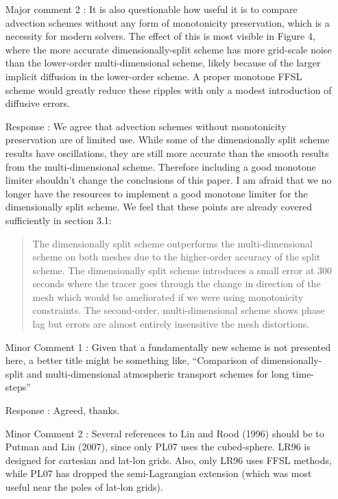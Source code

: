 \documentclass[12pt]{article}
\begin{document}
\begin{enumerate}
\item [Major comment 2]: It is also questionable how useful it is to compare advection schemes without any form of monotonicity preservation, which is a necessity for modern solvers. The effect of this is most visible in Figure 4, where the more accurate dimensionally-split scheme has more grid-scale noise than the lower-order multi-dimensional scheme, likely because of the larger implicit diffusion in the lower-order scheme. A proper monotone FFSL scheme would greatly reduce these ripples with only a modest introduction of diffusive errors.

\item [Response]: We agree that advection schemes without monotonicity preservation are of limited use. While some of the dimensionally split scheme results have oscillations, they are still more accurate than the smooth results from the multi-dimensional scheme. Therefore including a good monotone limiter shouldn't change the conclusions of this paper. I am afraid that we no longer have the resources to implement a good monotone limiter for the dimensionally split scheme. We feel that these points are already covered sufficiently in section 3.1:
\begin{quote}
The dimensionally split scheme outperforms the multi-dimensional scheme on both meshes due to the higher-order accuracy of the split scheme. The dimensionally split scheme introduces a small error at 300 seconds where the tracer goes through the change in direction of the mesh which would be ameliorated if we were using monotonicity constraints. The second-order, multi-dimensional scheme shows phase lag but errors are almost entirely insensitive the mesh distortions. 
\end{quote}

\item [Minor Comment 1]: Given that a fundamentally new scheme is not presented here, a better title might be something like, ``Comparison of dimensionally-split and multi-dimensional atmospheric transport schemes for long time-steps''

\item [Response]: Agreed, thanks.

\item [Minor Comment 2]: Several references to Lin and Rood (1996) should be to Putman and Lin (2007), since only PL07 uses the cubed-sphere. LR96 is designed for cartesian and lat-lon grids. Also, only LR96 uses FFSL methods, while PL07 has dropped the semi-Lagrangian extension (which was most useful near the poles of lat-lon grids). 


\end{enumerate}
\end{document}
